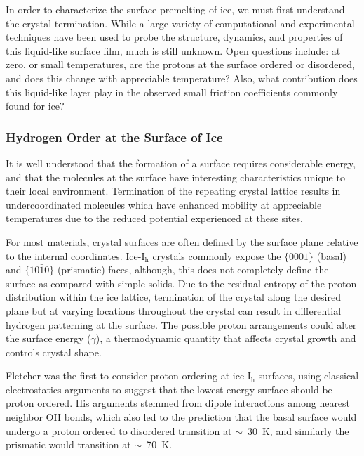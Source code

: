 In order to characterize the surface premelting of ice, we must first
understand the crystal termination. While a large
variety of computational and experimental techniques have been used to
probe the structure, dynamics, and properties of this liquid-like
surface film, much is still unknown. Open questions include: at zero,
or small temperatures, are the protons at the surface ordered or
disordered, and does this change with appreciable temperature? Also,
what contribution does this liquid-like layer play in the observed
small friction coefficients commonly found for ice?

\subsubsection{Hydrogen Order at the Surface of Ice}
It is well understood that the formation of a surface requires
considerable energy, and that the molecules at the surface have
interesting characteristics unique to their local
environment. Termination of the repeating crystal lattice results in
undercoordinated molecules which have enhanced mobility at appreciable
temperatures due to the reduced potential experienced at these
sites.

For most materials, crystal surfaces are often defined by the surface
plane relative to the internal coordinates. Ice-I$_\mathrm{h}$
crystals commonly expose the $\{0001\}$ (basal) and $\{10\bar{1}0\}$
(prismatic) faces, although, this does not completely define the
surface as compared with simple solids. Due to the residual entropy of
the proton distribution within the ice lattice, termination of the
crystal along the desired plane but at varying locations throughout
the crystal can result in differential hydrogen patterning at the
surface. The possible proton arrangements could alter the surface
energy ($\gamma$), a thermodynamic quantity that affects crystal growth and
controls crystal shape.

Fletcher was the first to consider proton ordering at
ice-I$_\mathrm{h}$ surfaces, using classical electrostatics arguments
to suggest that the lowest energy surface should be proton
ordered.\cite{Fletcher1992} His arguments stemmed from dipole
interactions among nearest neighbor OH bonds, which also led to the
prediction that the basal surface would undergo a proton ordered to
disordered transition at $\sim$~30~K, and similarly the prismatic
would transition at $\sim$~70~K.

